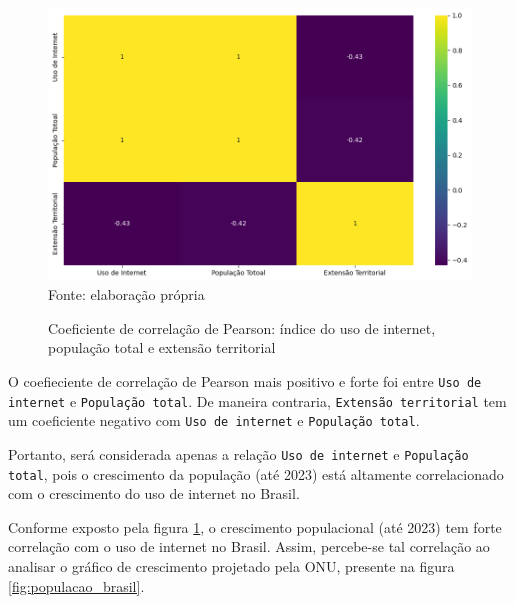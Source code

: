 \begin{figure}[ht]
    \centering
    \caption{Coeficiente de correlação de Pearson: índice do uso de internet, população total e extensão territorial}
    \includegraphics[width=1\linewidth]{figuras/internet/correlacao.png}
    \label{fig:internet_correlacao}
    \footnotesize{Fonte: elaboração própria}
\end{figure}

\newpage
O coefieciente de correlação de Pearson mais positivo e forte foi entre \texttt{Uso de internet} e \texttt{População total}. De maneira contraria, \texttt{Extensão territorial} tem um coeficiente negativo com \texttt{Uso de internet} e \texttt{População total}. 

Portanto, será considerada apenas a relação \texttt{Uso de internet} e \texttt{População total}, pois o crescimento da população (até 2023) está altamente correlacionado com o crescimento do uso de internet no Brasil.

Conforme exposto pela figura \ref{fig:internet_correlacao}, o crescimento populacional (até 2023) tem forte correlação com o uso de  internet no Brasil. Assim, percebe-se tal correlação ao analisar o gráfico de crescimento projetado pela ONU, presente na figura \ref{fig:populacao_brasil}.

